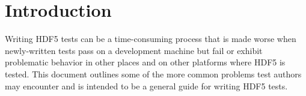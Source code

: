\documentclass[../HDF5_RFC.tex]{subfiles}
\begin{document}
\section{Introduction}
\label{intro}

Writing HDF5 tests can be a time-consuming process that is made worse when newly-written tests pass
on a development machine but fail or exhibit problematic behavior in other places and on other platforms
where HDF5 is tested. This document outlines some of the more common problems test authors may encounter
and is intended to be a general guide for writing HDF5 tests.
\end{document}
